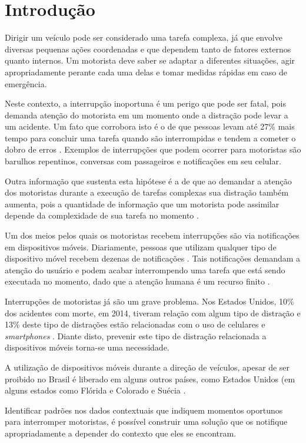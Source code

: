 \chapter{Introdução}
\label{introducao}

Dirigir um veículo pode ser considerado uma tarefa complexa, já que envolve diversas pequenas ações coordenadas e
que dependem tanto de fatores externos quanto internos. Um motorista deve saber se adaptar a diferentes situações,
agir apropriadamente perante cada uma delas e tomar medidas rápidas em caso de emergência.

Neste contexto, a interrupção inoportuna é um perigo que pode ser fatal, pois demanda atenção do motorista em um momento
onde a distração pode levar a um acidente. Um fato que corrobora isto é o de que pessoas levam até 27\% mais tempo para
concluir uma tarefa quando são interrompidas e tendem a cometer o dobro de erros \cite{bailey2006need}. Exemplos de
interrupções que podem ocorrer para motoristas são barulhos repentinos, conversas com passageiros e notificações em
seu celular.

Outra informação que sustenta esta hipótese é a de que ao demandar a atenção dos motoristas durante a execução de
tarefas complexas sua distração também aumenta, pois a quantidade de informação que um motorista pode assimilar
depende da complexidade de sua tarefa no momento \cite{schneegass2013data}.

Um dos meios pelos quais os motoristas recebem interrupções são via notificações em dispositivos móveis.
Diariamente, pessoas que utilizam qualquer tipo de dispositivo móvel recebem dezenas de notificações
\cite{pielot2014situ}. Tais notificações demandam a atenção do usuário e podem acabar interrompendo uma tarefa que
está sendo executada no momento, dado que a atenção humana é um recurso finito \cite{simon1971designing}.

Interrupções de motoristas já são um grave problema. Nos Estados Unidos, 10\% dos acidentes com morte, em 2014, tiveram relação
com algum tipo de distração e 13\% deste tipo de distrações estão relacionadas com o uso de celulares e \textit{smartphones}
\cite{distracted2014}. Diante disto, prevenir este tipo de distração relacionada a dispositivos móveis torna-se uma necessidade.

A utilização de dispositivos móveis durante a direção de veículos, apesar de ser proibido no Brasil é liberado em alguns
outros países, como Estados Unidos (em alguns estados como Flórida e Colorado \cite{cellphoneuse, distracteddriving} e Suécia \cite{swedendrive}.

Identificar padrões nos dados contextuais que indiquem momentos oportunos para interromper motoristas, é possível
construir uma solução que os notifique apropriadamente a depender do contexto que eles se encontram.
